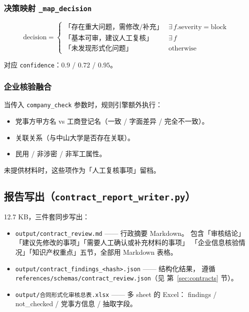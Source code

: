 \documentclass[11pt,a4paper]{article}
\begin{document}
\subsubsection{决策映射 \texttt{\_map\_decision}}

\begin{equation}\label{eq:decision}
\text{decision} =
\begin{cases}
\text{「存在重大问题，需修改/补充」} & \exists\,f.\text{severity}=\text{block} \\
\text{「基本可审，建议人工复核」} & \exists\,f \\
\text{「未发现形式化问题」} & \text{otherwise}
\end{cases}
\end{equation}

对应 \texttt{confidence}：$0.9$ / $0.72$ / $0.95$。

\subsubsection{企业核验融合}

当传入 \texttt{company\_check} 参数时，规则引擎额外执行：

\begin{itemize}[leftmargin=1.4em,itemsep=1pt]
  \item 党事方甲方名 vs 工商登记名（一致 / 字面差异 / 完全不一致）。
  \item 关联关系（与中山大学是否存在关联）。
  \item 民用 / 非涉密 / 非军工属性。
\end{itemize}

未提供材料时，这些项作为「人工复核事项」留档。

\subsection{报告写出（\texttt{contract\_report\_writer.py}）}

12.7 KB，三件套同步写出：

\begin{itemize}[leftmargin=1.4em,itemsep=2pt]
  \item \texttt{output/contract\_review.md} —— 行政摘要 Markdown。
    包含「审核结论」「建议先修改的事项」「需要人工确认或补充材料的事项」
    「企业信息核验情况」「知识产权重点」五节，全部用 Markdown 表格。
  \item \texttt{output/contract\_findings\_<hash>.json} —— 结构化结果，
    遵循 \texttt{references/schemas/contract\_review.json}（见
    第~\ref{sec:contracts} 节）。
  \item \texttt{output/合同形式化审核总表.xlsx} —— 多 sheet 的 Excel：
    findings / not\_checked / 党事方信息 / 抽取字段。
\end{itemize}
\end{document}
